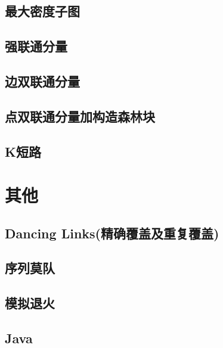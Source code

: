 \documentclass[11pt]{article}
\begin{document}
		\subsection{最大密度子图}
		
		\subsection{强联通分量}
		
		\subsection{边双联通分量}
		
		\subsection{点双联通分量加构造森林块}
		
		\subsection{K短路}
		
	\section{其他}
		\subsection{Dancing Links(精确覆盖及重复覆盖)}
		
		\subsection{序列莫队}
		
		\subsection{模拟退火}
		
		\subsection{Java}
		
\end{document}
